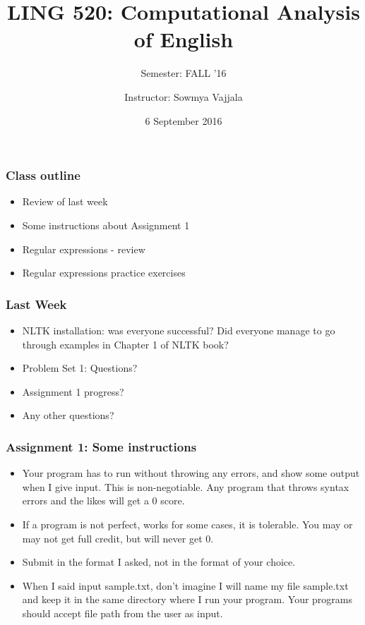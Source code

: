 \documentclass{beamer}
\author[Sowmya Vajjala]{Instructor: Sowmya Vajjala}
\title[LING 520]{LING 520: Computational Analysis of English}
\subtitle{Semester: FALL '16}
\date{6 September 2016}
\institute{Iowa State University, USA}
\begin{document}
\begin{frame}\titlepage
\end{frame}


\begin{frame}
\frametitle{Class outline}
\begin{itemize}
\item Review of last week
\item Some instructions about Assignment 1
\item Regular expressions - review
\item Regular expressions practice exercises
\end{itemize}
\end{frame}

\begin{frame}
\frametitle{Last Week}
\begin{itemize}
\item NLTK installation: was everyone successful? Did everyone manage to go through examples in Chapter 1 of NLTK book?
\item Problem Set 1: Questions?
\item Assignment 1 progress?
\item Any other questions?
\end{itemize}
\end{frame}

\begin{frame}
\frametitle{Assignment 1: Some instructions}
\begin{itemize}
\item Your program has to run without throwing any errors, and show some output when I give input. This is non-negotiable. Any program that throws syntax errors and the likes will get a 0 score.
\item If a program is not perfect, works for some cases, it is tolerable. You may or may not get full credit, but will never get 0.
\item Submit in the format I asked, not in the format of your choice.
\item When I said input sample.txt, don't imagine I will name my file sample.txt and keep it in the same directory where I run your program. Your programs should accept file path from the user as input. 
\end{itemize}
\end{frame}
\end{document}
